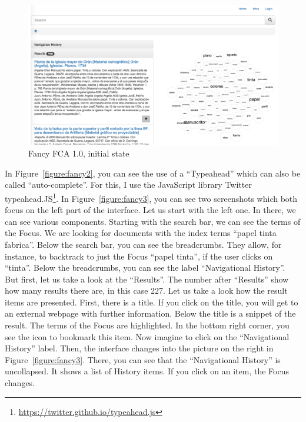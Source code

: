 \documentclass[11pt]{report}
\begin{document}
\begin{figure}[!ht]
	\centering
	\includegraphics[width=\linewidth]{images/fancy1}
\caption{Fancy FCA 1.0, initial state}
\label{figure:fancy1}
\end{figure}

 In Figure~\ref{figure:fancy2}, you can see the use of a ``Typeahead'' which can also be called ``auto-complete''. For this, I use the JavaScript library Twitter typeahead.JS\footnote{\url{https://twitter.github.io/typeahead.js}}. In Figure~\ref{figure:fancy3}, you can see two screenshots which both focus on the left part of the interface. Let us start with the left one. In there, we can see various components. Starting with the search bar, we can see the terms of the Focus. We are looking for documents with the index terms ``papel tinta fabrica''. Below the search bar, you can see the breadcrumbs. They allow, for instance, to backtrack to just the Focus ``papel tinta'', if the user clicks on ``tinta''. Below the breadcrumbs, you can see the label ``Navigational History''. But first, let us take a look at the ``Results''. The number after ``Results'' show how many results there are, in this case 227. Let us take a look how the result items are presented. First, there is a title. If you click on the title, you will get to an external webpage with further information. Below the title is a snippet of the result. The terms of the Focus are highlighted. In the bottom right corner, you see the icon to bookmark this item. Now imagine to click on the ``Navigational History'' label. Then, the interface changes into the picture on the right in Figure~\ref{figure:fancy3}. There, you can see that the ``Navigational History'' is uncollapsed. It shows a list of History items. If you click on an item, the Focus changes. \\
 
\end{document}
